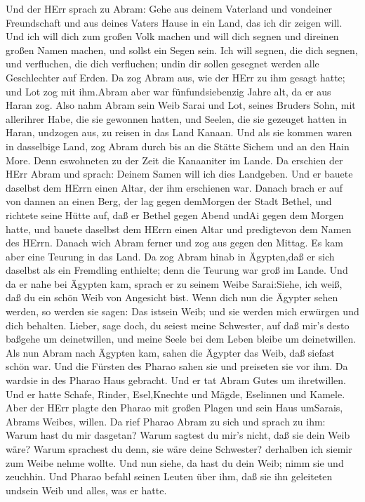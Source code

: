  Und der HErr sprach zu Abram: Gehe aus deinem Vaterland und
vondeiner Freundschaft und aus deines Vaters Hause in ein Land, das ich
dir zeigen will.  Und ich will dich zum großen Volk machen
und will dich segnen und direinen großen Namen machen, und sollst ein
Segen sein.  Ich will segnen, die dich segnen, und
verfluchen, die dich verfluchen; undin dir sollen gesegnet werden alle
Geschlechter auf Erden.  Da zog Abram aus, wie der HErr zu
ihm gesagt hatte; und Lot zog mit ihm.Abram aber war fünfundsiebenzig
Jahre alt, da er aus Haran zog.  Also nahm Abram sein Weib
Sarai und Lot, seines Bruders Sohn, mit allerihrer Habe, die sie
gewonnen hatten, und Seelen, die sie gezeuget hatten in Haran, undzogen
aus, zu reisen in das Land Kanaan. Und als sie kommen waren in
dasselbige Land,  zog Abram durch bis an die Stätte Sichem
und an den Hain More. Denn eswohneten zu der Zeit die Kanaaniter im
Lande.  Da erschien der HErr Abram und sprach: Deinem Samen
will ich dies Landgeben. Und er bauete daselbst dem HErrn einen Altar,
der ihm erschienen war.  Danach brach er auf von dannen an
einen Berg, der lag gegen demMorgen der Stadt Bethel, und richtete seine
Hütte auf, daß er Bethel gegen Abend undAi gegen dem Morgen hatte, und
bauete daselbst dem HErrn einen Altar und predigtevon dem Namen des
HErrn.  Danach wich Abram ferner und zog aus gegen den
Mittag.  Es kam aber eine Teurung in das Land. Da zog Abram
hinab in Ägypten,daß er sich daselbst als ein Fremdling enthielte; denn
die Teurung war groß im Lande.  Und da er nahe bei Ägypten
kam, sprach er zu seinem Weibe Sarai:Siehe, ich weiß, daß du ein schön
Weib von Angesicht bist.  Wenn dich nun die Ägypter sehen
werden, so werden sie sagen: Das istsein Weib; und sie werden mich
erwürgen und dich behalten.  Lieber, sage doch, du seiest
meine Schwester, auf daß mir's desto baßgehe um deinetwillen, und meine
Seele bei dem Leben bleibe um deinetwillen.  Als nun Abram
nach Ägypten kam, sahen die Ägypter das Weib, daß siefast schön war.
 Und die Fürsten des Pharao sahen sie und preiseten sie vor
ihm. Da wardsie in des Pharao Haus gebracht.  Und er tat
Abram Gutes um ihretwillen. Und er hatte Schafe, Rinder, Esel,Knechte
und Mägde, Eselinnen und Kamele.  Aber der HErr plagte den
Pharao mit großen Plagen und sein Haus umSarais, Abrams Weibes, willen.
 Da rief Pharao Abram zu sich und sprach zu ihm: Warum hast
du mir dasgetan? Warum sagtest du mir's nicht, daß sie dein Weib wäre?
 Warum sprachest du denn, sie wäre deine Schwester?
derhalben ich siemir zum Weibe nehme wollte. Und nun siehe, da hast du
dein Weib; nimm sie und zeuchhin.  Und Pharao befahl seinen
Leuten über ihm, daß sie ihn geleiteten undsein Weib und alles, was er
hatte.

